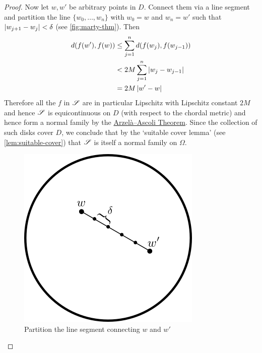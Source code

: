 \begin{proof}
    Now let $w, w'$ be arbitrary points in $D$. Connect them via a line segment and partition the line $\{w_0, \dots, w_{n}\}$ with $w_0 = w$ and $w_{n} = w'$ such that $\left|w_{j + 1} - w_j\right| < \delta$ (see \autoref{fig:marty-thm}). Then 
    \begin{align*}
        d(f(w'), f(w)) &\leq \sum_{j = 1}^n d(f(w_{j}), f(w_{j - 1}))\\
        &< 2M \sum_{j = 1}^n \left|w_j - w_{j - 1}\right|\\
        &= 2M \left|w' - w\right|
    \end{align*}
    Therefore all the $f$ in $\mathscr{S}$ are in particular Lipschitz with Lipschitz constant $2M$ and hence $\mathscr{S}$ is equicontinuous on $D$ (with respect to the chordal metric) and hence form a normal family by the \hyperref[thm:arzela-ascoli]{Arzelà–Ascoli Theorem}. Since the collection of such disks cover $D$, we conclude that by the `suitable cover lemma' (see \autoref{lem:suitable-cover}) that $\mathscr{S}$ is itself a normal family on $\Omega$. 

    \begin{figure}[ht]
        \centering
        \includegraphics[scale=0.7]{Images/marty_thm.png}
        \caption{Partition the line segment connecting $w$ and $w'$}
        \label{fig:marty-thm}
    \end{figure}
\end{proof}

